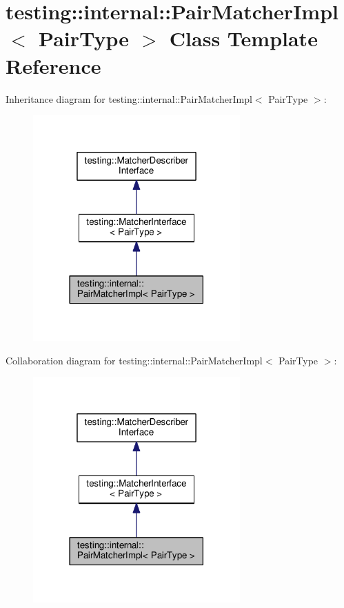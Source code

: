 \hypertarget{classtesting_1_1internal_1_1PairMatcherImpl}{}\section{testing\+:\+:internal\+:\+:Pair\+Matcher\+Impl$<$ Pair\+Type $>$ Class Template Reference}
\label{classtesting_1_1internal_1_1PairMatcherImpl}


Inheritance diagram for testing\+:\+:internal\+:\+:Pair\+Matcher\+Impl$<$ Pair\+Type $>$\+:\nopagebreak
\begin{figure}[H]
\begin{center}
\leavevmode
\includegraphics[width=225pt]{classtesting_1_1internal_1_1PairMatcherImpl__inherit__graph}
\end{center}
\end{figure}


Collaboration diagram for testing\+:\+:internal\+:\+:Pair\+Matcher\+Impl$<$ Pair\+Type $>$\+:\nopagebreak
\begin{figure}[H]
\begin{center}
\leavevmode
\includegraphics[width=225pt]{classtesting_1_1internal_1_1PairMatcherImpl__coll__graph}
\end{center}
\end{figure}
